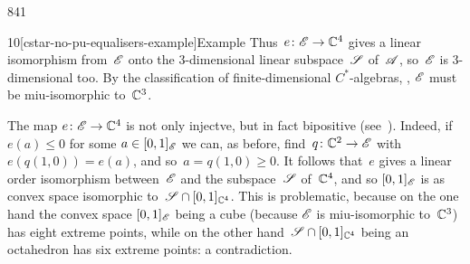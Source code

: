 \begin{parsec}{841}
\begin{point}{10}[cstar-no-pu-equalisers-example]{Example}
Thus~$e\colon \mathscr{E}\to \mathbb{C}^4$
gives a linear isomorphism from~$\mathscr{E}$
onto the 3-dimensional linear subspace~$\mathscr{S}$ of~$\mathscr{A}$,
so~$\mathscr{E}$ is 3-dimensional too.
By the classification of finite-dimensional
$C^*$-algebras, , 
$\mathscr{E}$ must be miu-isomorphic to~$\mathbb{C}^3$.

The map $e\colon \mathscr{E}\to\mathbb{C}^4$
is not only injectve,
but in fact bipositive (see~).
Indeed,  if $e(a)\leq 0$ for some $a\in[0,1]_{\mathscr{E}}$
we can, as before,
find~$q\colon \mathbb{C}^2 \to \mathscr{E}$
with $e(q(1,0))=e(a)$,
and so~$a=q(1,0)\geq 0$.
It follows that~$e$ gives a linear order isomorphism
between~$\mathscr{E}$ and the subspace~$\mathscr{S}$ of~$\mathbb{C}^4$,
and so $[0,1]_{\mathscr{E}}$ is as convex space
isomorphic to~$\mathscr{S}\cap[0,1]_{\mathbb{C}^4}$.
This is problematic,
because on the one
hand
the convex space $[0,1]_{\mathscr{E}}$ being a cube
(because
$\mathscr{E}$ is miu-isomorphic to~$\mathbb{C}^3$)
has eight extreme points,
while on the other 
hand~$\mathscr{S}\cap[0,1]_{\mathbb{C}^4}$ being
an octahedron
has six extreme points: a contradiction.
\end{point}
\end{parsec}
